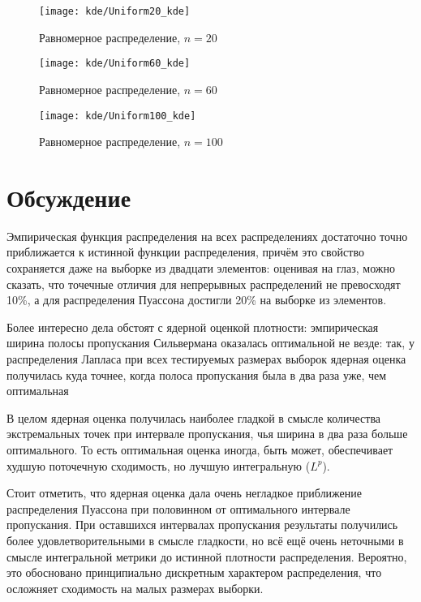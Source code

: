 \begin{figure}[H]
	\begin{center}
		\texttt{[image: kde/Uniform20\_kde]}
		\caption{Равномерное распределение, $n=20$} 
		\label{pic:pic_name} 
	\end{center}
\end{figure}

\begin{figure}[H]
	\begin{center}
		\texttt{[image: kde/Uniform60\_kde]}
		\caption{Равномерное распределение, $n=60$} 
		\label{pic:pic_name} 
	\end{center}
\end{figure}

\begin{figure}[H]
	\begin{center}
		\texttt{[image: kde/Uniform100\_kde]}
		\caption{Равномерное распределение, $n=100$} 
		\label{pic:pic_name} 
	\end{center}
\end{figure}

\section{Обсуждение}

Эмпирическая функция распределения на всех распределениях достаточно точно приближается к истинной функции распределения, причём это свойство сохраняется даже на выборке из двадцати элементов: оценивая на глаз, можно сказать, что точечные отличия для непрерывных распределений не превосходят 10\%, а для распределения Пуассона достигли 20\% на выборке из 
 элементов.
 
 Более интересно дела обстоят с ядерной оценкой плотности: эмпирическая ширина полосы пропускания Сильвермана оказалась оптимальной не везде: так, у распределения Лапласа при всех тестируемых размерах выборок ядерная оценка получилась куда точнее, когда полоса пропускания была в два раза уже, чем оптимальная
 
 В целом ядерная оценка получилась наиболее гладкой в смысле количества экстремальных точек при интервале пропускания, чья ширина в два раза больше оптимального. То есть оптимальная оценка иногда, быть может, обеспечивает худшую поточечную сходимость, но лучшую интегральную ($L^p$).
 
 Стоит отметить, что ядерная оценка дала очень негладкое приближение распределения Пуассона при половинном от оптимального интервале пропускания. При оставшихся интервалах пропускания результаты получились более удовлетворительными в смысле гладкости, но всё ещё очень неточными в смысле интегральной метрики до истинной плотности распределения.
 Вероятно, это обосновано принципиально дискретным характером распределения, что осложняет сходимость на малых размерах выборки.
